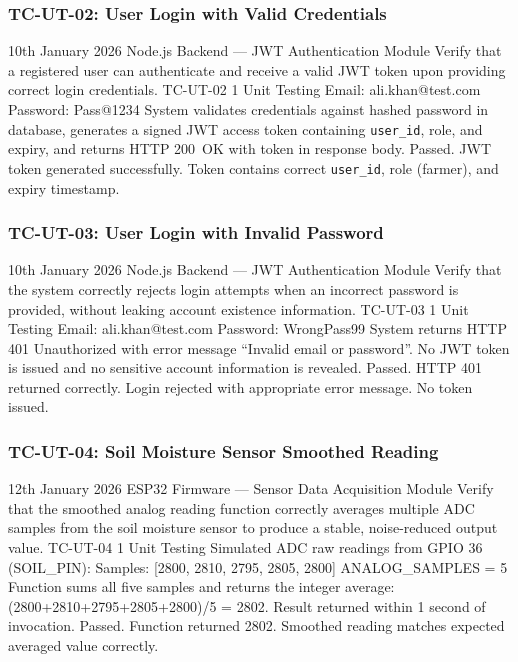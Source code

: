 \subsubsection{TC-UT-02: User Login with Valid Credentials}

\testcase%
{10th January 2026}%
{Node.js Backend --- JWT Authentication Module}%
{Verify that a registered user can authenticate and receive
a valid JWT token upon providing correct login credentials.}%
{TC-UT-02}%
{1}%
{Unit Testing}%
{Email: ali.khan@test.com \newline
Password: Pass@1234}%
{System validates credentials against hashed password in
database, generates a signed JWT access token containing
\texttt{user\_id}, role, and expiry, and returns HTTP
200~OK with token in response body.}%
{Passed. JWT token generated successfully. Token contains
correct \texttt{user\_id}, role (farmer), and expiry
timestamp.}

\subsubsection{TC-UT-03: User Login with Invalid Password}

\testcase%
{10th January 2026}%
{Node.js Backend --- JWT Authentication Module}%
{Verify that the system correctly rejects login attempts
when an incorrect password is provided, without leaking
account existence information.}%
{TC-UT-03}%
{1}%
{Unit Testing}%
{Email: ali.khan@test.com \newline
Password: WrongPass99}%
{System returns HTTP 401 Unauthorized with error message
``Invalid email or password''. No JWT token is issued and
no sensitive account information is revealed.}%
{Passed. HTTP 401 returned correctly. Login rejected with
appropriate error message. No token issued.}

\subsubsection{TC-UT-04: Soil Moisture Sensor Smoothed Reading}

\testcase%
{12th January 2026}%
{ESP32 Firmware --- Sensor Data Acquisition Module}%
{Verify that the smoothed analog reading function correctly
averages multiple ADC samples from the soil moisture sensor
to produce a stable, noise-reduced output value.}%
{TC-UT-04}%
{1}%
{Unit Testing}%
{Simulated ADC raw readings from GPIO 36 (SOIL\_PIN): \newline
Samples: [2800, 2810, 2795, 2805, 2800] \newline
ANALOG\_SAMPLES = 5}%
{Function sums all five samples and returns the integer
average: (2800+2810+2795+2805+2800)/5 = 2802. Result
returned within 1 second of invocation.}%
{Passed. Function returned 2802. Smoothed reading matches
expected averaged value correctly.}

